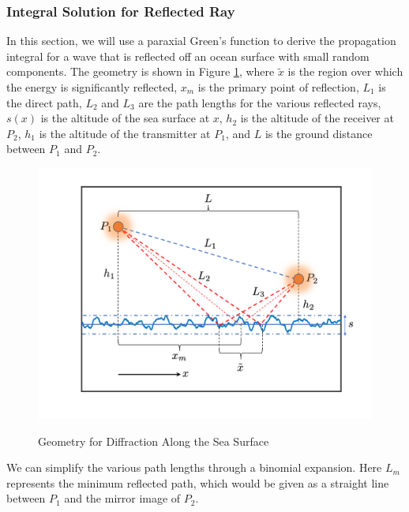 \subsubsection{Integral Solution for Reflected Ray}
In this section, we will use a paraxial Green's function to derive the propagation integral for a wave that is reflected off an ocean surface with small random components. The geometry is shown in Figure \ref{gf_fig:15}, where $\tilde{x}$ is the region over which the energy is significantly reflected, $x_m$ is the primary point of reflection, $L_1$ is the direct path, $L_2$ and $L_3$ are the path lengths for the various reflected rays, $s(x)$ is the altitude of the sea surface at $x$, $h_2$ is the altitude of the receiver at $P_2$, $h_1$ is the altitude of the transmitter at $P_1$, and $L$ is the ground distance between $P_1$ and $P_2$. 

\begin{figure}[ht]
  \begin{center}
\includegraphics[width=5in]{../media/analysis/multipath_layout.png}
  \end{center}
  \renewcommand{\baselinestretch}{1} \small\normalsize
  \begin{quote}
    \caption[Geometry for Diffraction Along the Sea Surface]{Geometry for Diffraction Along the Sea Surface\label{gf_fig:15}}
  \end{quote}
\end{figure}
\renewcommand{\baselinestretch}{2} \small\normalsize

We can simplify the various path lengths through a binomial expansion. Here $L_m$ represents the minimum reflected path, which would be given as a straight line between $P_1$ and the mirror image of $P_2$. 

